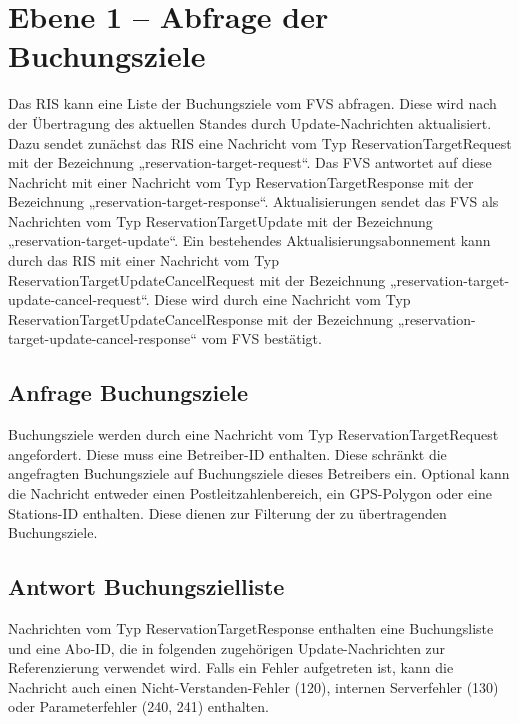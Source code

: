


\section{Ebene 1 -- Abfrage der Buchungsziele}
Das RIS kann eine Liste der Buchungsziele vom FVS abfragen. Diese wird nach der Übertragung des aktuellen Standes durch Update-Nachrichten aktualisiert. Dazu sendet zunächst das RIS eine Nachricht vom Typ ReservationTargetRequest mit der Bezeichnung „reservation-target-request“. Das FVS antwortet auf diese Nachricht mit einer Nachricht vom Typ ReservationTargetResponse mit der Bezeichnung „reservation-target-response“. Aktualisierungen sendet das FVS als Nachrichten vom Typ ReservationTargetUpdate mit der Bezeichnung „reservation-target-update“. Ein bestehendes Aktualisierungsabonnement kann durch das RIS mit einer Nachricht vom Typ ReservationTargetUpdateCancelRequest mit der Bezeichnung „reservation-target-update-cancel-request“. Diese wird durch eine Nachricht vom Typ ReservationTargetUpdateCancelResponse mit der Bezeichnung „reservation-target-update-cancel-response“ vom FVS bestätigt.



\subsection{Anfrage Buchungsziele}
Buchungsziele werden durch eine Nachricht vom Typ ReservationTargetRequest angefordert. Diese muss eine Betreiber-ID enthalten. Diese schränkt die angefragten Buchungsziele auf Buchungsziele dieses Betreibers ein. Optional kann die Nachricht entweder einen Postleitzahlenbereich, ein GPS-Polygon oder eine Stations-ID enthalten. Diese dienen zur Filterung der zu übertragenden Buchungsziele.



\subsection{Antwort Buchungszielliste}
Nachrichten vom Typ ReservationTargetResponse enthalten eine Buchungsliste und eine Abo-ID, die in folgenden zugehörigen Update-Nachrichten zur Referenzierung verwendet wird. Falls ein Fehler aufgetreten ist, kann die Nachricht auch einen Nicht-Verstanden-Fehler (120), internen Serverfehler (130) oder Parameterfehler (240, 241) enthalten.

